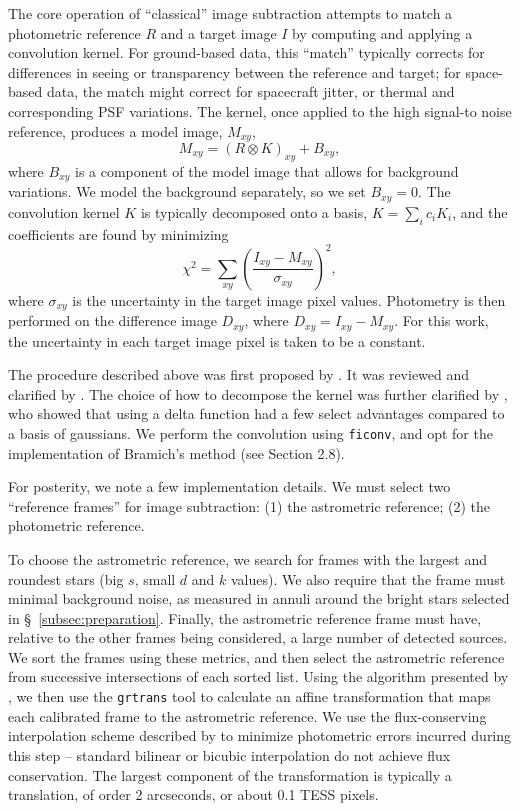\documentclass[12pt,twocolumn,tighten]{aastex62}
\begin{document}
The core operation of ``classical'' image subtraction
attempts to match a photometric reference $R$ and a target image $I$ by 
computing and applying a convolution kernel.
For ground-based data, this ``match'' typically corrects for
differences in seeing or transparency between the reference and
target; for space-based data, the match might correct for spacecraft
jitter, or thermal and corresponding PSF variations.
The kernel, once applied to the high signal-to noise reference,
produces a model image, $M_{xy}$,
\begin{equation}
    M_{xy} = (R \otimes K)_{xy} + B_{xy},
\end{equation}
where $B_{xy}$ is a component of the model image that allows for
background variations.
We model the background separately, so we set $B_{xy}=0$.
The convolution kernel $K$ is typically decomposed onto a
basis, $K = \sum_i c_i K_i$, and the coefficients are found
by minimizing
\begin{equation}
    \chi^2 = \sum_{xy} \left( \frac{I_{xy} - M_{xy}}{\sigma_{xy}} \right)^2,
    \label{eq:chisq_conv}
\end{equation}
where $\sigma_{xy}$ is the uncertainty in the target image pixel values.
Photometry is then performed on the difference image $D_{xy}$, where
$D_{xy} = I_{xy} - M_{xy}$.
For this work, the uncertainty in each target image pixel is
taken to be a constant.	

The procedure described above was first proposed by \citet{Alard_Lupton_1998}.
It was reviewed and clarified by \citet{miller_optimal_2008}.
The choice of how to decompose the kernel was further clarified by
\citet{bramich_new_2008}, who showed that using a delta function
had a few select advantages compared to a basis of gaussians.
We perform the convolution using \texttt{ficonv}, and opt for
the implementation of Bramich's method (see \citealt{Pal_2009} Section 2.8).

For posterity, we note a few implementation details.
We must select two ``reference frames'' for image subtraction:
(1) the astrometric reference; (2) the photometric reference.

To choose the astrometric reference, we search for frames with
the largest and roundest stars (big $s$, small $d$ and $k$ values).
We also require
that the frame must minimal background noise, as measured in annuli
around the bright stars selected in \S~\ref{subsec:preparation}.
Finally, the astrometric reference frame must have, relative to the 
other frames being
considered, a large number of detected sources.
We sort the frames using these metrics, and then select the
astrometric reference from successive intersections of each sorted
list.
Using the algorithm presented by \citet{pal_astrometry_2006}, we then
use the \texttt{grtrans} tool to
calculate an affine transformation that maps each calibrated frame
to the astrometric reference.
We use the flux-conserving interpolation
scheme described by \citet{Pal_2009} to minimize photometric errors
incurred during this step --
standard bilinear or bicubic interpolation do not achieve flux
conservation.  
The largest component of the transformation is typically a translation,
of order 2 arcseconds, or about 0.1 TESS pixels.
\end{document}
